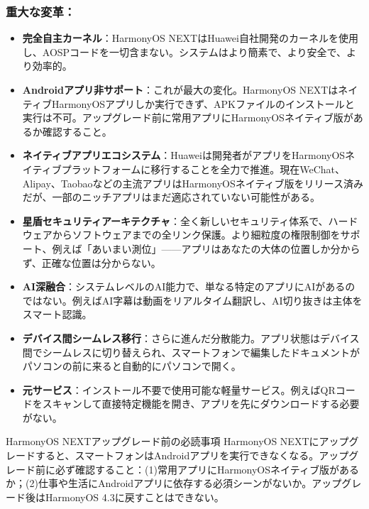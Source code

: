 \subsubsection*{重大な変革：}

\begin{itemize}
  \item \textbf{完全自主カーネル}：HarmonyOS NEXTはHuawei自社開発のカーネルを使用し、AOSPコードを一切含まない。システムはより簡素で、より安全で、より効率的。
  \item \textbf{Androidアプリ非サポート}：これが最大の変化。HarmonyOS NEXTはネイティブHarmonyOSアプリしか実行できず、APKファイルのインストールと実行は不可。アップグレード前に常用アプリにHarmonyOSネイティブ版があるか確認すること。
  \item \textbf{ネイティブアプリエコシステム}：Huaweiは開発者がアプリをHarmonyOSネイティブプラットフォームに移行することを全力で推進。現在WeChat、Alipay、Taobaoなどの主流アプリはHarmonyOSネイティブ版をリリース済みだが、一部のニッチアプリはまだ適応されていない可能性がある。
  \item \textbf{星盾セキュリティアーキテクチャ}：全く新しいセキュリティ体系で、ハードウェアからソフトウェアまでの全リンク保護。より細粒度の権限制御をサポート、例えば「あいまい測位」——アプリはあなたの大体の位置しか分からず、正確な位置は分からない。
  \item \textbf{AI深融合}：システムレベルのAI能力で、単なる特定のアプリにAIがあるのではない。例えばAI字幕は動画をリアルタイム翻訳し、AI切り抜きは主体をスマート認識。
  \item \textbf{デバイス間シームレス移行}：さらに進んだ分散能力。アプリ状態はデバイス間でシームレスに切り替えられ、スマートフォンで編集したドキュメントがパソコンの前に来ると自動的にパソコンで開く。
  \item \textbf{元サービス}：インストール不要で使用可能な軽量サービス。例えばQRコードをスキャンして直接特定機能を開き、アプリを先にダウンロードする必要がない。
\end{itemize}

\begin{tcbwarn}{HarmonyOS NEXTアップグレード前の必読事項}
HarmonyOS NEXTにアップグレードすると、スマートフォンはAndroidアプリを実行できなくなる。アップグレード前に必ず確認すること：(1)常用アプリにHarmonyOSネイティブ版があるか；(2)仕事や生活にAndroidアプリに依存する必須シーンがないか。アップグレード後はHarmonyOS 4.3に戻すことはできない。

\end{tcbwarn}

